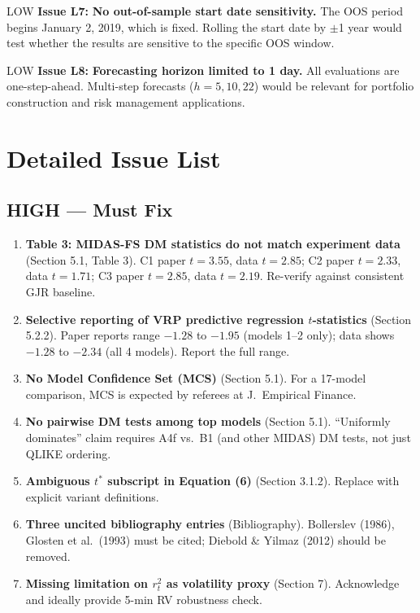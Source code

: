 \documentclass[12pt,a4paper]{article}
\begin{document}
LOW \textbf{Issue L7:} \textbf{No out-of-sample start date sensitivity.} The OOS period begins January 2, 2019, which is fixed. Rolling the start date by $\pm$1 year would test whether the results are sensitive to the specific OOS window.

LOW \textbf{Issue L8:} \textbf{Forecasting horizon limited to 1 day.} All evaluations are one-step-ahead. Multi-step forecasts ($h = 5, 10, 22$) would be relevant for portfolio construction and risk management applications.


\section*{Detailed Issue List}

\subsection*{\textcolor{errorred}{HIGH --- Must Fix}}

\begin{enumerate}[label=H\arabic*.]
\item \textbf{Table 3: MIDAS-FS DM statistics do not match experiment data} (Section 5.1, Table 3). C1 paper $t=3.55$, data $t=2.85$; C2 paper $t=2.33$, data $t=1.71$; C3 paper $t=2.85$, data $t=2.19$. Re-verify against consistent GJR baseline.

\item \textbf{Selective reporting of VRP predictive regression $t$-statistics} (Section 5.2.2). Paper reports range $-1.28$ to $-1.95$ (models 1--2 only); data shows $-1.28$ to $-2.34$ (all 4 models). Report the full range.

\item \textbf{No Model Confidence Set (MCS)} (Section 5.1). For a 17-model comparison, MCS is expected by referees at J.\ Empirical Finance.

\item \textbf{No pairwise DM tests among top models} (Section 5.1). ``Uniformly dominates'' claim requires A4f vs.\ B1 (and other MIDAS) DM tests, not just QLIKE ordering.

\item \textbf{Ambiguous $t^*$ subscript in Equation (6)} (Section 3.1.2). Replace with explicit variant definitions.

\item \textbf{Three uncited bibliography entries} (Bibliography). Bollerslev (1986), Glosten et al.\ (1993) must be cited; Diebold \& Yilmaz (2012) should be removed.

\item \textbf{Missing limitation on $r_t^2$ as volatility proxy} (Section 7). Acknowledge and ideally provide 5-min RV robustness check.
\end{enumerate}
\end{document}
